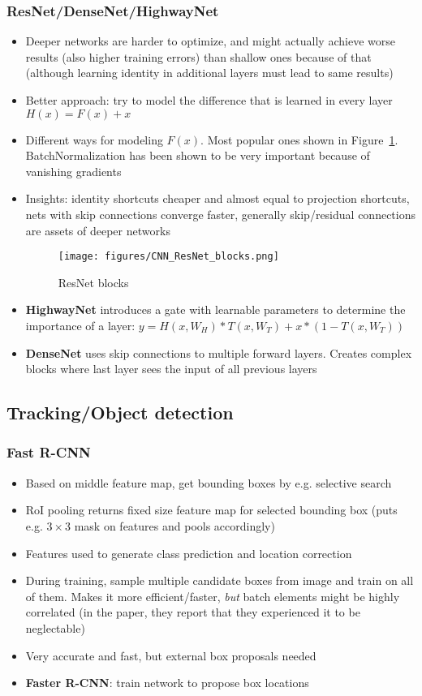 \subsubsection{ResNet/DenseNet/HighwayNet}
\begin{itemize}
	\item Deeper networks are harder to optimize, and might actually achieve worse results (also higher training errors) than shallow ones because of that (although learning identity in additional layers must lead to same results)
	\item Better approach: try to model the difference that is learned in every layer $H(x) = F(x) + x$
	\item Different ways for modeling $F(x)$. Most popular ones shown in Figure~\ref{fig:CNN_ResNet_blocks}. BatchNormalization has been shown to be very important because of vanishing gradients
	\item Insights: identity shortcuts cheaper and almost equal to projection shortcuts, nets with skip connections converge faster, generally skip/residual connections are assets of deeper networks
	\begin{figure}[ht!]
		\centering
		\texttt{[image: figures/CNN\_ResNet\_blocks.png]}
		\caption{ResNet blocks}
		\label{fig:CNN_ResNet_blocks}
	\end{figure}
	\item \textbf{HighwayNet} introduces a gate with learnable parameters to determine the importance of a layer: $y = H(x, W_H) * T(x, W_T) + x * (1 - T(x, W_T))$
	\item \textbf{DenseNet} uses skip connections to multiple forward layers. Creates complex blocks where last layer sees the input of all previous layers
\end{itemize}
\subsection{Tracking/Object detection}
\subsubsection{Fast R-CNN}
\begin{itemize}
	\item Based on middle feature map, get bounding boxes by e.g. selective search 
	\item RoI pooling returns fixed size feature map for selected bounding box (puts e.g. $3\times 3$ mask on features and pools accordingly)
	\item Features used to generate class prediction and location correction
	\item During training, sample multiple candidate boxes from image and train on all of them. Makes it more efficient/faster, \textit{but} batch elements might be highly correlated (in the paper, they report that they experienced it to be neglectable)
	\item Very accurate and fast, but external box proposals needed
	\item \textbf{Faster R-CNN}: train network to propose box locations
\end{itemize}
